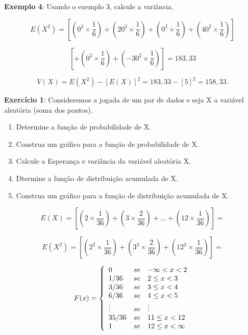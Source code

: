 \textbf{Exemplo 4}: Usando o exemplo 3, calcule a variãncia.


$$
E(X^{2})= \left[\left(0^{2} \times \frac{1}{6}\right)+\left(20^{2}
\times \frac{1}{6}\right)+ \left(0^{2} \times \frac{1}{6}\right)+
\left(40^{2} \times \frac{1}{6}\right)\right]
$$


$$
\left[+\left(0^{2} \times \frac{1}{6}\right)+\left(-30^{2} \times
\frac{1}{6}\right)\right]= 183,33
$$


$$
V(X) = E(X^{2})-[E(X)]^{2} = 183,33 - [5]^{2}= 158,33.
$$


\textbf{Exercício 1}: Consideremos a jogada de um par de dados e
seja X a variável aleatória (soma dos pontos).

\begin{enumerate}
    \item Determine a função de probabilidade de X.
    \item Construa um gráfico para a função de probabilidade de X.
    \item Calcule a Esperança e variância da variável aleatória X.
    \item Dtermine a função de distribuição acumulada de X.
    \item Construa um gráfico para a função de distribuição acumulada de X.
\end{enumerate}



\begin{table}[!htb] 
\end{table}

$$
E(X)= \left[\left(2 \times \frac{1}{36}\right)+\left(3 \times
\frac{2}{36}\right)+ \ldots +\left( 12 \times
\frac{1}{36}\right)\right]=
$$


$$
E(X^{2})= \left[\left(2^{2} \times \frac{1}{36}\right)+\left(3^{2}
\times \frac{2}{36}\right)+\left(12^{2} \times
\frac{1}{36}\right)\right]=
$$

$$
F(x)=
\left\{%
\begin{array}{ll}
   0      & se \quad \hbox{$-\infty < x < 2$} \\
   1/36   & se \quad \hbox{$2 \leq x < 3$} \\
   3/36   & se \quad \hbox{$3 \leq x < 4$} \\
   6/36   & se \quad \hbox{$4 \leq x < 5$} \\
   \vdots & se \quad \hbox{$\vdots$} \\
   35/36  & se \quad \hbox{$11 \leq x < 12$} \\
    1     & se \quad \hbox{$12 \leq x < \infty$} \\
\end{array}%
\right.
$$

